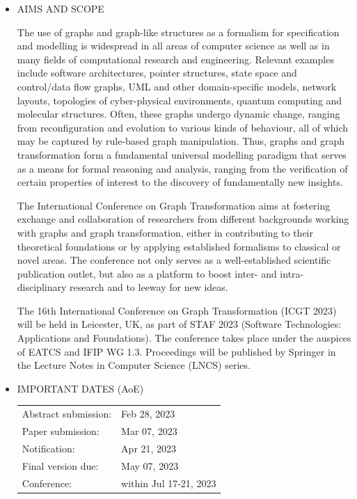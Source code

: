 \documentclass[prodmode,acmtecs]{acmsmall} %
\begin{document}
\begin{itemize}\item  AIMS AND SCOPE  
 
  The use of graphs and graph-like structures as a formalism for specification and modelling is widespread in all areas of computer science as well as in many fields of computational research and engineering. Relevant examples include software architectures, pointer structures, state space and control/data flow graphs, UML and other domain-specific models, network layouts, topologies of cyber-physical environments, quantum computing and molecular structures. Often, these graphs undergo dynamic change, ranging from reconfiguration and evolution to various kinds of behaviour, all of which may be captured by rule-based graph manipulation. Thus, graphs and graph transformation form a fundamental universal modelling paradigm that serves as a means for formal reasoning and analysis, ranging from the verification of certain properties of interest to the discovery of fundamentally new insights. 
 
  The International Conference on Graph Transformation aims at fostering exchange and collaboration of researchers from different backgrounds working with graphs and graph transformation, either in contributing to their theoretical foundations or by applying established formalisms to classical or novel areas. The conference not only serves as a well-established scientific publication outlet, but also as a platform to boost inter- and intra-disciplinary research and to leeway for new ideas. 
 
  The 16th International Conference on Graph Transformation (ICGT 2023) will be held in Leicester, UK, as part of STAF 2023 (Software Technologies: Applications and Foundations). The conference takes place under the auspices of EATCS and IFIP WG 1.3. Proceedings will be published by Springer in the Lecture Notes in Computer Science (LNCS) series. 
 
\item  IMPORTANT DATES (AoE) 
 
\begin{tabulary}{\linewidth}{LL}Abstract submission:  & Feb 28, 2023 \\
Paper submission:  & Mar 07, 2023 \\
Notification:  & Apr 21, 2023 \\
Final version due:  & May 07, 2023 \\
Conference:  & within  Jul 17-21, 2023 \\
\end{tabulary}
 

\end{itemize}
\end{document}
